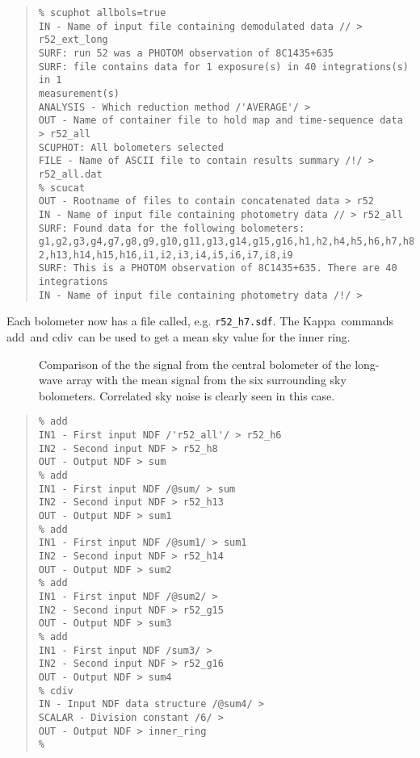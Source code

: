 \documentclass[twoside,11pt,fleqn]{article}
\newenvironment{myquote}{\begin{quote}\begin{small}}{\end{small}\end{quote}}
\newcommand{\Kappa}{\xref{{\sc Kappa}}{sun95}{}}
\newcommand{\task}[1]{{\sf #1}}
\newcommand{\cdiv}{\xref{\task{cdiv}}{sun95}{CDIV}}
\newcommand{\add}{\xref{\task{add}}{sun95}{ADD}}
\newcommand{\xref}[3]{#1}
\begin{document}
\begin{myquote}
\begin{verbatim}
% scuphot allbols=true
IN - Name of input file containing demodulated data // > r52_ext_long
SURF: run 52 was a PHOTOM observation of 8C1435+635
SURF: file contains data for 1 exposure(s) in 40 integrations(s) in 1
measurement(s)
ANALYSIS - Which reduction method /'AVERAGE'/ >
OUT - Name of container file to hold map and time-sequence data > r52_all
SCUPHOT: All bolometers selected
FILE - Name of ASCII file to contain results summary /!/ > r52_all.dat
% scucat
OUT - Rootname of files to contain concatenated data > r52
IN - Name of input file containing photometry data // > r52_all
SURF: Found data for the following bolometers:
g1,g2,g3,g4,g7,g8,g9,g10,g11,g13,g14,g15,g16,h1,h2,h4,h5,h6,h7,h8,h9,h10,h11,h1
2,h13,h14,h15,h16,i1,i2,i3,i4,i5,i6,i7,i8,i9
SURF: This is a PHOTOM observation of 8C1435+635. There are 40 integrations
IN - Name of input file containing photometry data /!/ >
\end{verbatim}
\end{myquote}

Each bolometer now has a file called, e.g. {\tt r52\_h7.sdf}. The
\Kappa\ commands \add\ and \cdiv\ can be used to get a
mean sky value for the inner ring.

\begin{figure}
\caption{Comparison of the the signal from the central bolometer of
the long-wave array with the mean signal from the six surrounding sky
bolometers. Correlated sky noise is clearly seen in this case.}
\label{f3}
\end{figure}

\begin{myquote}
\begin{verbatim}
% add
IN1 - First input NDF /'r52_all'/ > r52_h6
IN2 - Second input NDF > r52_h8
OUT - Output NDF > sum
% add
IN1 - First input NDF /@sum/ > sum
IN2 - Second input NDF > r52_h13
OUT - Output NDF > sum1
% add
IN1 - First input NDF /@sum1/ > sum1
IN2 - Second input NDF > r52_h14
OUT - Output NDF > sum2
% add
IN1 - First input NDF /@sum2/ >
IN2 - Second input NDF > r52_g15
OUT - Output NDF > sum3
% add
IN1 - First input NDF /sum3/ >
IN2 - Second input NDF > r52_g16
OUT - Output NDF > sum4
% cdiv
IN - Input NDF data structure /@sum4/ >
SCALAR - Division constant /6/ >
OUT - Output NDF > inner_ring
%
\end{verbatim}
\end{myquote}
\end{document}
